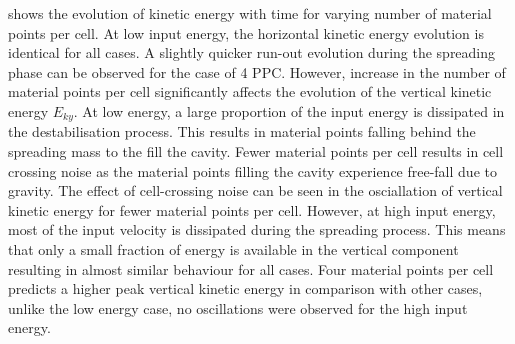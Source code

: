  shows the evolution of kinetic energy with time for varying 
number of material points per cell. At low input energy, the horizontal kinetic 
energy evolution is identical for all cases. A slightly quicker run-out 
evolution during the spreading phase can be observed for the case of 4 PPC.  
However, increase in the number of material points per cell significantly 
affects the evolution of the vertical kinetic energy $E_{ky}$. At low energy, a 
large proportion of the input energy is dissipated in the destabilisation 
process. This results in material points falling behind the spreading mass to 
the fill the cavity. Fewer material points per cell results in cell 
crossing noise as the material points filling the cavity experience free-fall 
due to gravity. The effect of cell-crossing noise can be seen in the 
osciallation of vertical kinetic energy for fewer material points per cell. 
However, at high input energy, most of the input velocity is dissipated during 
the spreading process. This means that only a small fraction of energy is 
available in the vertical component resulting in almost similar behaviour for 
all cases. Four material points per cell predicts a higher peak vertical 
kinetic energy in comparison with other cases, unlike the low energy case, no 
oscillations were observed for the high input energy.

